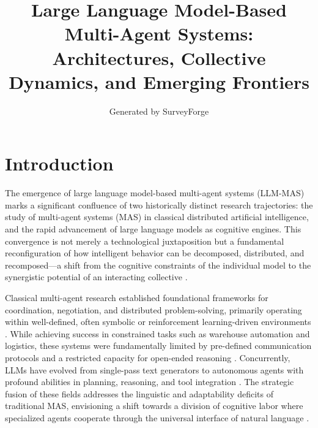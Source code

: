 \documentclass[11pt,a4paper]{article}
\title{Large Language Model-Based Multi-Agent Systems: Architectures, Collective Dynamics, and Emerging Frontiers}
\author{Generated by SurveyForge}
\date{}
\begin{document}
\maketitle
\tableofcontents
\newpage



\section{Introduction}


The emergence of large language model-based multi-agent systems (LLM-MAS) marks a significant confluence of two historically distinct research trajectories: the study of multi-agent systems (MAS) in classical distributed artificial intelligence, and the rapid advancement of large language models as cognitive engines. This convergence is not merely a technological juxtaposition but a fundamental reconfiguration of how intelligent behavior can be decomposed, distributed, and recomposed---a shift from the cognitive constraints of the individual model to the synergistic potential of an interacting collective \cite{arxiv:2308.11432v5,arxiv:2309.07864v3}.

Classical multi-agent research established foundational frameworks for coordination, negotiation, and distributed problem-solving, primarily operating within well-defined, often symbolic or reinforcement learning-driven environments \cite{arxiv:2602.11583v1,arxiv:2503.13415v1}. While achieving success in constrained tasks such as warehouse automation and logistics, these systems were fundamentally limited by pre-defined communication protocols and a restricted capacity for open-ended reasoning \cite{arxiv:2503.13415v1}. Concurrently, LLMs have evolved from single-pass text generators to autonomous agents with profound abilities in planning, reasoning, and tool integration \cite{arxiv:2503.21460v1}. The strategic fusion of these fields addresses the linguistic and adaptability deficits of traditional MAS, envisioning a shift towards a division of cognitive labor where specialized agents cooperate through the universal interface of natural language \cite{arxiv:2306.03314v1}.
\end{document}

